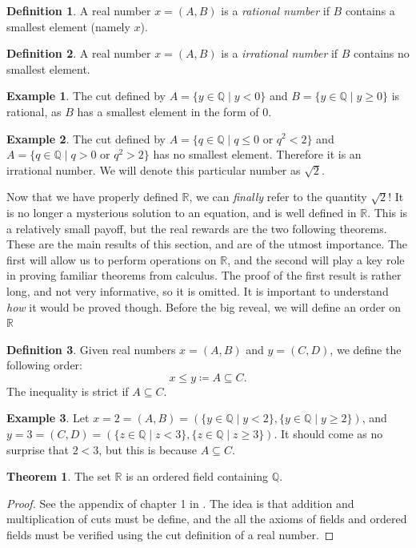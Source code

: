 \documentclass{article}
\newcommand{\R}{\mathbb{R}}
\newcommand{\Q}{\mathbb{Q}}
\theoremstyle{definition}
\newtheorem{theorem}{Theorem}[section]
\newtheorem{definition}{Definition}[section]
\newtheorem{example}{Example}[section]
\begin{document}
	\begin{definition}\label{def1.15}
		A real number $ x=(A,B) $ is a \textit{\color{red}rational number} if $ B $ contains a smallest element (namely $ x $).
	\end{definition}
	\begin{definition}\label{def1.16}
		A real number $ x=(A,B) $ is a \textit{\color{red}irrational number} if $ B $ contains no smallest element.
	\end{definition}
	\begin{example}
		The cut defined by $ A=\{y\in \Q \mid y<0\} $ and $ B=\{y\in\Q\mid y\ge 0\} $ is rational, as $ B $ has a smallest element in the form of $ 0 $.  
	\end{example}
	\begin{example}
		The cut defined by $A=\{q\in\Q\mid q\le 0\text{ or }q^2<2 \} $ and $ A=\{q\in\Q\mid q> 0\text{ or }q^2>2 \} $ has no smallest element. Therefore it is an irrational number. We will denote this particular number as $ \sqrt{2} $. 
	\end{example}
	Now that we have properly defined $ \R $, we can \textit{finally} refer to the quantity $ \sqrt{2} $! It is no longer a mysterious solution to an equation, and is well defined in $ \R $. This is a relatively small payoff, but the real rewards are the two following theorems. These are the main results of this section, and are of the utmost importance. The first will allow us to perform operations on $ \R $, and the second will play a key role in proving familiar theorems from calculus. The proof of the first result is rather long, and not very informative, so it is omitted. It is important to understand \textit{how} it would be proved though. Before the big reveal, we will define an order on $ \R $
	\begin{definition}\label{def1.17}
		Given real numbers $ x=(A,B) $ and $ y=(C,D) $, we define the following order:$$x\le y\coloneqq A\subseteq C .$$ The inequality is strict if $ A\subseteq C $. 
	\end{definition}
	\begin{example}
		Let $ x=2=(A,B)=(\{y\in \Q \mid y<2\},\{y\in\Q\mid y\ge 2\})$, and $ y=3=(C,D)=(\{z\in \Q \mid z<3\},\{z\in\Q\mid z\ge 3\})$. It should come as no surprise that $ 2<3 $, but this is because $ A\subseteq C $.  
	\end{example}
	\begin{theorem}
		The set $ \R $ is an ordered field containing $ \Q $.
	\end{theorem}
	\begin{proof}
		See the appendix of chapter 1 in \cite{rudin1964principles}. The idea is that addition and multiplication of cuts must be define, and the all the axioms of fields and ordered fields must be verified using the cut definition of a real number. 
	\end{proof}
\end{document}
